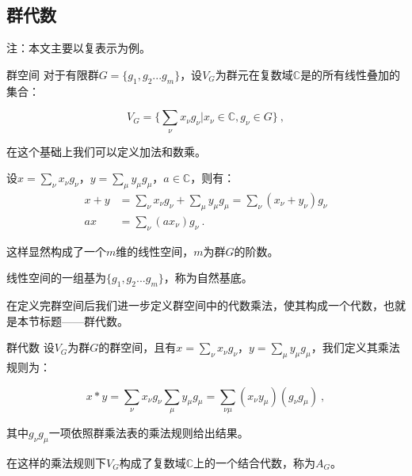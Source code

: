 

\subsection{群代数}

注：本文主要以复表示为例。

\begin{definition}{群空间}
对于有限群$G=\{g_1,g_2...g_m\}$，设$V_G$为群元在复数域$\mathbb{C}$是的所有线性叠加的集合：

\begin{equation}
V_G=\{\displaystyle\sum_\nu x_\nu g_\nu|x_\nu \in \mathbb{C},g_\nu \in G\}~,
\end{equation}

在这个基础上我们可以定义加法和数乘。

设$x=\displaystyle\sum_\nu x_\nu g_\nu$，$y=\displaystyle\sum_\mu y_\mu g_\mu$，$a\in \mathbb{C}$，则有：
\begin{align}
x+y&=\displaystyle\sum_\nu x_\nu g_\nu+\displaystyle\sum_\mu y_\mu g_\mu=\displaystyle\sum_\nu(x_\nu+y_\nu)g_\nu\\
ax&=\displaystyle\sum_\nu (ax_\nu) g_\nu~.
\end{align}

这样显然构成了一个$m$维的线性空间，$m$为群$G$的阶数。

线性空间的一组基为$\{g_1,g_2...g_m\}$，称为自然基底。

\end{definition}

在定义完群空间后我们进一步定义群空间中的代数乘法，使其构成一个代数，也就是本节标题——群代数。

\begin{definition}{群代数}
设$V_G$为群$G$的群空间，且有$x=\displaystyle\sum_\nu x_\nu g_\nu$，$y=\displaystyle\sum_\mu y_\mu g_\mu$，我们定义其乘法规则为：

\begin{equation}
x * y = \displaystyle\sum_{\nu} x_\nu g_\nu \sum_{\mu} y_\mu g_\mu =
\displaystyle\sum_{\nu\mu}(x_\nu y_\mu) (g_\nu g_\mu)~,
\end{equation}

其中$g_\nu g_\mu$一项依照群乘法表的乘法规则给出结果。

在这样的乘法规则下$V_G$构成了复数域$\mathbb{C}$上的一个结合代数，称为$A_G$。

\end{definition}

